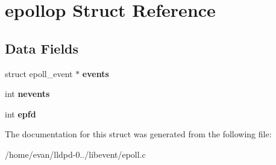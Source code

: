 \section{epollop \-Struct \-Reference}
\label{structepollop}
\subsection*{\-Data \-Fields}
\begin{DoxyCompactItemize}
\item 
struct epoll\-\_\-event $\ast$ {\bfseries events}\label{structepollop_a18bcd14e4d4cab5184d3b046754cd248}

\item 
int {\bfseries nevents}\label{structepollop_a5209ed8d981dc170e77bea159c5bbe48}

\item 
int {\bfseries epfd}\label{structepollop_ad9ea3108c3907d7dedaf4ee7283bef1d}

\end{DoxyCompactItemize}


\-The documentation for this struct was generated from the following file\-:\begin{DoxyCompactItemize}
\item 
/home/evan/lldpd-\/0../libevent/epoll.\-c\end{DoxyCompactItemize}
